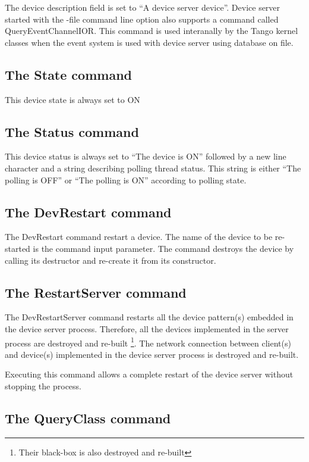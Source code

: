 \vspace{0.3cm}


The device description field is set to ``A device server device''.
Device server started with the -file command line option also supports
a command called QueryEventChannelIOR.
This command is used interanally by the Tango kernel classes when
the event system is used with device server using database on file.


\subsection{The State command}

This device state is always set to ON


\subsection{The Status command}

This device status is always set to ``The device is ON'' followed
by a new line character and a string describing polling thread status.
This string is either ``The polling is OFF'' or ``The polling is
ON'' according to polling state.


\subsection{The DevRestart command}

The DevRestart command restart a device. The name of the device to
be re-started is the command input parameter. The command destroys
the device by calling its destructor and re-create it from its constructor.


\subsection{The RestartServer command}

The DevRestartServer command restarts all the device pattern(s) embedded
in the device server process. Therefore, all the devices implemented
in the server process are destroyed and re-built%
\footnote{Their black-box is also destroyed and re-built%
}. The network connection between client(s) and device(s) implemented
in the device server process is destroyed and re-built. 

Executing this command allows a complete restart of the device server
without stopping the process.


\subsection{The QueryClass command}


